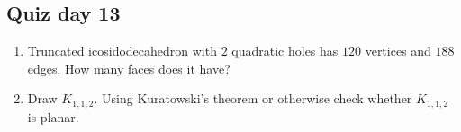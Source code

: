 \documentclass[12pt]{article}
\begin{document}
\subsection*{Quiz day 13}

\begin{enumerate}
    \item Truncated icosidodecahedron with $2$ quadratic holes has $120$ vertices and $188$ edges. 
    How many faces does it have?
    \item Draw $K_{1, 1, 2}$. Using Kuratowski's theorem or otherwise check whether $K_{1, 1, 2}$ is planar. 
\end{enumerate}
\end{document}
